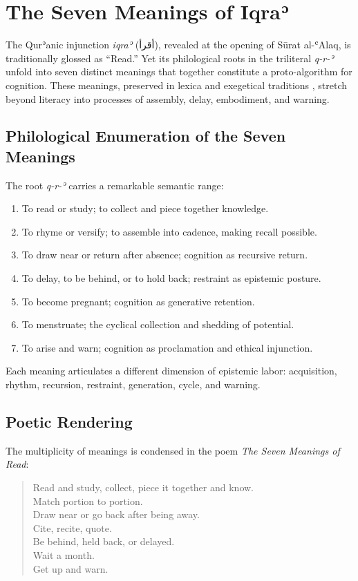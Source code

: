 \documentclass[a4paper,11pt,openany]{book}
\begin{document}
\chapter{The Seven Meanings of Iqraʾ}

The Qurʾanic injunction \textit{iqraʾ} (أقرأ), revealed at the opening of Sūrat al-ʿAlaq, is traditionally glossed as ``Read.'' Yet its philological roots in the triliteral \textit{q-r-ʾ} unfold into seven distinct meanings that together constitute a proto-algorithm for cognition. These meanings, preserved in lexica and exegetical traditions \citep{wiktionaryIqra}, stretch beyond literacy into processes of assembly, delay, embodiment, and warning.

\section{Philological Enumeration of the Seven Meanings}
The root \textit{q-r-ʾ} carries a remarkable semantic range:
\begin{enumerate}
  \item To read or study; to collect and piece together knowledge.
  \item To rhyme or versify; to assemble into cadence, making recall possible.
  \item To draw near or return after absence; cognition as recursive return.
  \item To delay, to be behind, or to hold back; restraint as epistemic posture.
  \item To become pregnant; cognition as generative retention.
  \item To menstruate; the cyclical collection and shedding of potential.
  \item To arise and warn; cognition as proclamation and ethical injunction.
\end{enumerate}
Each meaning articulates a different dimension of epistemic labor: acquisition, rhythm, recursion, restraint, generation, cycle, and warning.

\section{Poetic Rendering}
The multiplicity of meanings is condensed in the poem \emph{The Seven Meanings of Read}:

\begin{quote}
Read and study, collect, piece it together and know. \\
Match portion to portion. \\
Draw near or go back after being away. \\
Cite, recite, quote. \\
Be behind, held back, or delayed. \\
Wait a month. \\
Get up and warn.
\end{quote}
\end{document}

